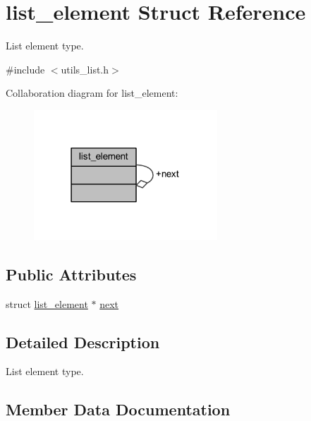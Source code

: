 \hypertarget{structlist__element}{}\section{list\+\_\+element Struct Reference}
\label{structlist__element}


List element type.  




{\ttfamily \#include $<$utils\+\_\+list.\+h$>$}



Collaboration diagram for list\+\_\+element\+:
\nopagebreak
\begin{figure}[H]
\begin{center}
\leavevmode
\includegraphics[width=195pt]{structlist__element__coll__graph}
\end{center}
\end{figure}
\subsection*{Public Attributes}
\begin{DoxyCompactItemize}
\item 
struct \hyperlink{structlist__element}{list\+\_\+element} $\ast$ \hyperlink{structlist__element_a66e1becb179745b2a4070941b9a4052d}{next}
\end{DoxyCompactItemize}


\subsection{Detailed Description}
List element type. 

\subsection{Member Data Documentation}
\mbox{\label{structlist__element_a66e1becb179745b2a4070941b9a4052d}} 
